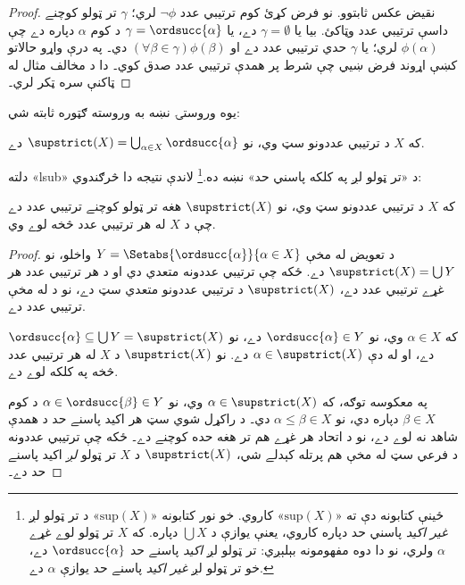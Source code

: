 \documentclass[../../../include/open-logic-section]{subfiles}
\begin{document}
\begin{proof}
نقيض عکس ثابتوو. نو فرض کړئ کوم ترتيبي عدد $\lnot\phi$ لري؛
$\gamma$ تر ټولو کوچنے داسې ترتيبي عدد وټاکئ. بيا يا
$\gamma = \emptyset$ دے، يا $\gamma = \ordsucc{\alpha}$ د کوم $\alpha$
دپاره دے چې $\phi(\alpha)$ لري؛ يا $\gamma$ حدي ترتيبي عدد دے او
$(\forall
\beta \in \gamma)\phi(\beta)$ دي۔
په درې واړو حالاتو کښې اړوند فرض ښيي چې شرط پر همدې
ترتيبي عدد صدق کوي۔ دا د مخالف مثال له ټاکنې سره ټکر لري۔
\end{proof}
\noindent
يوه وروستۍ نښه به وروسته ګټوره ثابته شي:

\begin{defn}
که $X$ د ترتيبي عددونو سټ وي، نو $\supstrict(X) = \bigcup_{\alpha
\in X} \ordsucc{\alpha}$ دے.
\end{defn}
\noindent
دلته «lsub» د «تر ټولو لږ په کلکه پاسني حد» نښه ده.\footnote{ځينې کتابونه
دې ته «$\text{sup}(X)$» کاروي. خو نور کتابونه «$\text{sup}(X)$» د تر ټولو
لږ \emph{غير اکيد} پاسني حد دپاره کاروي، يعنې يوازې د $\bigcup X$ دپاره.
که $X$ تر ټولو لوے غړے $\alpha$ ولري، نو دا دوه مفهومونه بېلېږي:
تر ټولو لږ \emph{اکيد} پاسنے حد $\ordsucc{\alpha}$ دے، خو تر ټولو لږ
\emph{غير اکيد} پاسنے حد يوازې $\alpha$ دے.} لاندې نتيجه دا څرګندوي:

\begin{prop}
که $X$ د ترتيبي عددونو سټ وي، نو $\supstrict(X)$ هغه تر ټولو کوچنے
ترتيبي عدد دے چې د $X$ له هر ترتيبي عدد څخه لوے وي.
\end{prop}

\begin{proof}
د تعويض له مخې $Y = \Setabs{\ordsucc{\alpha}}{\alpha \in X}$ واخلو، نو
$\supstrict(X) = \bigcup Y$ دے. ځکه چې ترتيبي عددونه متعدي دي او د هر
ترتيبي عدد هر غړے ترتيبي عدد دے، $\supstrict(X)$ د ترتيبي عددونو متعدي
سټ دے، نو د  له مخې ترتيبي عدد دے.

که $\alpha \in X$ وي، نو $\ordsucc{\alpha} \in Y$ دے، نو $\ordsucc{\alpha}
\subseteq \bigcup Y = \supstrict(X)$ دے، او له دې $\alpha \in
\supstrict(X)$ دے. نو $\supstrict(X)$ د $X$ له هر ترتيبي عدد څخه په کلکه
لوے دے.

په معکوسه توګه، که $\alpha \in \supstrict(X)$ وي، نو $\alpha \in
\ordsucc{\beta} \in Y$ د کوم $\beta \in X$ دپاره دي، نو $\alpha \leq
\beta \in X$ دي۔ د راکړل شوي سټ هر اکيد پاسنے حد د
همدې شاهد نه لوے دے، نو د اتحاد هر غړے هم تر هغه حده
کوچنے دے۔ ځکه چې ترتيبي عددونه د فرعي سټ له مخې هم
پرتله کېدلے شي، $\supstrict(X)$ د $X$ تر ټولو \emph{لږ}
اکيد پاسنے حد دے۔
\end{proof}
\end{document}
